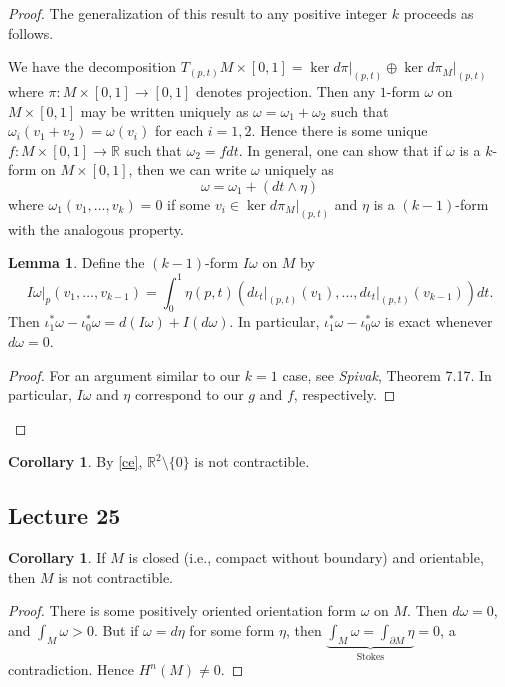 \documentclass[10pt,letterpaper,cm]{nupset}
\theoremstyle{definition}
\theoremstyle{theorem}
\newtheorem{lemma}[definition]{Lemma}
\newtheorem{corollary}[definition]{Corollary}
\theoremstyle{remark}
\newcommand{\R}{\mathbb R}
\newcommand{\1}{\mathbf{1}}
\newcommand{\0}{\vec 0}
\begin{document}
\begin{proof}
\medskip


The generalization of this result to any positive integer $k$ proceeds as follows.

\medskip


We have the decomposition $T_{(p,t)}M \times [0,1] = \ker d\pi\bigr\rvert_{(p,t)} \oplus \ker d\pi_M\bigr\rvert_{(p,t)}$ where $\pi: M \times [0,1]\to [0,1]$ denotes projection. Then any $1$-form $\omega$ on $M \times [0,1]$ may be written uniquely as $\omega = \omega_1 + \omega_2$ such that $\omega_i(v_1 + v_2) = \omega(v_i)$ for each $i=1, 2$. Hence there is some unique $f : M \times [0,1] \to \R$ such that $\omega_2 = f dt$. In general, one can show that if $\omega$ is a $k$-form on $M \times [0,1]$, then we can write $\omega$ uniquely as $$\omega = \omega_1 + (dt \wedge \eta)$$ where $\omega_1(v_1, \ldots, v_k) =0$ if some $v_i \in  \ker d\pi_M\bigr\rvert_{(p,t)}$ and $\eta$ is a $(k-1)$-form with the analogous property.
\begin{lemma}\label{exact}
Define the $(k-1)$-form $I\omega$ on $M$ by $$I \omega \bigr\rvert_p(v_1, \ldots, v_{k-1}) = \int_0^1 \eta(p, t)(d\iota_t\bigr\rvert_{(p,t)}(v_1), \ldots, d\iota_t\bigr\rvert_{(p,t)}(v_{k-1}))dt   .$$ Then $\iota^{\ast}_1\omega  - \iota^{\ast}_0 \omega = d(I\omega) + I(d\omega)$. In particular, $\iota^{\ast}_1\omega  - \iota^{\ast}_0 \omega$ is exact whenever $d\omega =0$.
\end{lemma}
\begin{proof}
For an argument similar to our $k=1$ case,  see \textit{Spivak}, Theorem 7.17. In particular, $I\omega$ and $\eta$ correspond to our $g$ and $f$, respectively.
\end{proof}

\end{proof}

\begin{corollary}
By \cref{ce}, $\R^2\setminus \{0\}$ is not contractible.
\end{corollary}

\subsection{Lecture 25}

\begin{corollary}
If $M$ is closed (i.e., compact without boundary) and orientable, then $M$ is not contractible.
\end{corollary}
\begin{proof}
There is some positively oriented orientation form $\omega$ on $M$. Then $d\omega =0$, and $\int_M \omega >0$. But if $\omega = d \eta$ for some form $\eta$, then $\underbrace{\int_M \omega =  \int_{\partial{M}} \eta}_{\text{Stokes}} =0$, a contradiction. Hence $H^n(M) \ne 0$.
\end{proof}
\end{document}

